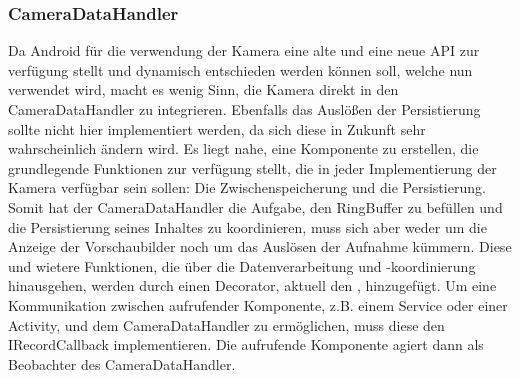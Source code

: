 \subsubsection{CameraDataHandler} \label{app:klasse:CameraDataHandler}
Da Android für die verwendung der Kamera eine alte und eine neue API zur verfügung stellt und dynamisch entschieden werden können soll, welche nun verwendet wird, macht es wenig Sinn, die Kamera direkt in den CameraDataHandler zu integrieren. Ebenfalls das Auslößen der Persistierung sollte nicht hier implementiert werden, da sich diese in Zukunft sehr wahrscheinlich ändern wird. Es liegt nahe, eine Komponente zu erstellen, die grundlegende Funktionen zur verfügung stellt, die in jeder Implementierung der Kamera verfügbar sein sollen: Die Zwischenspeicherung und die Persistierung. Somit hat der CameraDataHandler die Aufgabe, den RingBuffer zu befüllen und die Persistierung seines Inhaltes zu koordinieren, muss sich aber weder um die Anzeige der Vorschaubilder noch um das Auslösen der Aufnahme kümmern. Diese und wietere Funktionen, die über die Datenverarbeitung und -koordinierung hinausgehen, werden durch einen Decorator, aktuell den , hinzugefügt. Um eine Kommunikation zwischen aufrufender Komponente, z.B. einem Service oder einer Activity, und dem CameraDataHandler zu ermöglichen, muss diese den IRecordCallback implementieren. Die aufrufende Komponente agiert dann als Beobachter des CameraDataHandler.
\newline

